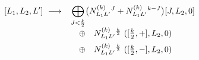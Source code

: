 \begin{equation}\label{mmDAflowIII}
[L_{1},L_{2},L'] \ \longrightarrow \ \makebox[8cm][l]{$\displaystyle\begin{array}[t]{l}\displaystyle \bigoplus_{J< \frac{k}{2}}
\bigl( N^{(k)}_{L_{1}L'}{}^{J}+N^{(k)}_{L_{1}L'}{}^{k-J} \bigr) [J,L_{2},0]\\
 \quad \oplus \quad N^{(k)}_{L_{1}L'}{}^{\frac{k}{2}} \ ([\frac{k}{2},+],L_{2},0) \\[2mm]
 \quad \oplus \quad N^{(k)}_{L_{1}L'}{}^{\frac{k}{2}} \ ([\frac{k}{2},-],L_{2},0)
\end{array}$ }
\end{equation}


